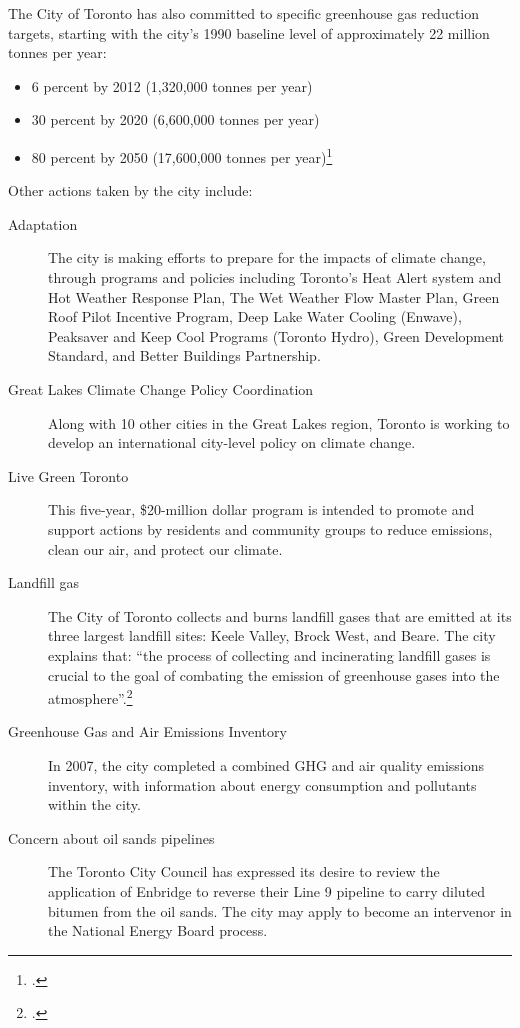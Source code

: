 \documentclass[10pt]{article}
\begin{document}
The City of Toronto has also committed to specific greenhouse gas reduction targets, starting with the city's 1990 baseline level of approximately 22 million tonnes per year:
\begin{itemize}
	\item 6 percent by 2012 (1,320,000 tonnes per year)
	\item 30 percent by 2020 (6,600,000 tonnes per year)
	\item 80 percent by 2050 (17,600,000 tonnes per year)\footcite{TorontoAQandCC}
\end{itemize}



Other actions taken by the city include:
\begin{description}
	\item [Adaptation] The city is making efforts to prepare for the impacts of climate change, through programs and policies including Toronto’s Heat Alert system and Hot Weather Response Plan, The Wet Weather Flow Master Plan, Green Roof Pilot Incentive Program, Deep Lake Water Cooling (Enwave), Peaksaver and Keep Cool Programs (Toronto Hydro), Green Development Standard, and Better Buildings Partnership.
	\item [Great Lakes Climate Change Policy Coordination] Along with 10 other cities in the Great Lakes region, Toronto is working to develop an international city-level policy on climate change.
	\item [Live Green Toronto] This  five-year, \$20-million dollar program is intended to promote and support actions by residents and community groups to reduce emissions, clean our air, and protect our climate.
	\item [Landfill gas] The City of Toronto collects and burns landfill gases that are emitted at its three largest landfill sites: Keele Valley, Brock West, and Beare. The city explains that: ``the process of collecting and incinerating landfill gases is crucial to the goal of combating the emission of greenhouse gases into the atmosphere''.\footcite{TorontoAQandCC}
	\item [Greenhouse Gas and Air Emissions Inventory] In 2007, the city completed a combined GHG and air quality emissions inventory, with information about energy consumption and pollutants within the city. 
	\item [Concern about oil sands pipelines] The Toronto City Council has expressed its desire to review the application of Enbridge to reverse their Line 9 pipeline to carry diluted bitumen from the oil sands. 
	The city may apply to become an intervenor in the National Energy Board process.
\end{description}
\end{document}
